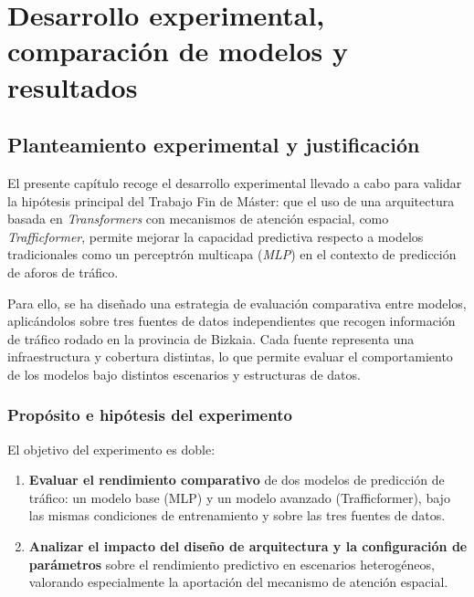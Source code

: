 \section{Desarrollo experimental, comparación de modelos y resultados}
\label{sec:desarrollo_comp_results}

%
%

\subsection{Planteamiento experimental y justificación}
\label{sec:planteamiento_experimental}

El presente capítulo recoge el desarrollo experimental llevado a cabo para validar la hipótesis principal del Trabajo Fin de Máster: que el uso de una arquitectura basada en \textit{Transformers} con mecanismos de atención espacial, como \textit{Trafficformer}, permite mejorar la capacidad predictiva respecto a modelos tradicionales como un perceptrón multicapa (\textit{MLP}) en el contexto de predicción de aforos de tráfico.

Para ello, se ha diseñado una estrategia de evaluación comparativa entre modelos, aplicándolos sobre tres fuentes de datos independientes que recogen información de tráfico rodado en la provincia de Bizkaia. Cada fuente representa una infraestructura y cobertura distintas, lo que permite evaluar el comportamiento de los modelos bajo distintos escenarios y estructuras de datos.

\subsubsection*{Propósito e hipótesis del experimento}

El objetivo del experimento es doble:

\begin{enumerate}
	\item \textbf{Evaluar el rendimiento comparativo} de dos modelos de predicción de tráfico: un modelo base (MLP) y un modelo avanzado (Trafficformer), bajo las mismas condiciones de entrenamiento y sobre las tres fuentes de datos.
	\item \textbf{Analizar el impacto del diseño de arquitectura y la configuración de parámetros} sobre el rendimiento predictivo en escenarios heterogéneos, valorando especialmente la aportación del mecanismo de atención espacial.
\end{enumerate}

